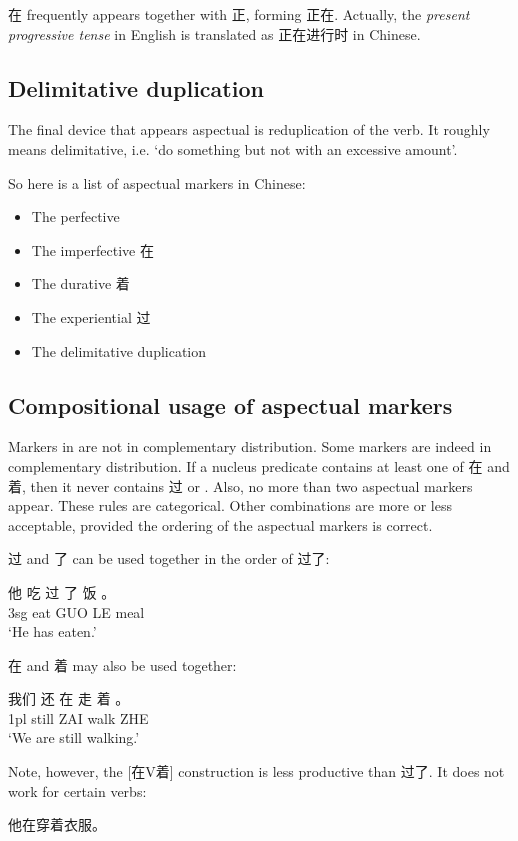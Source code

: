 在 frequently appears together with 正, forming 正在. 
Actually, the \emph{present progressive tense} in English is translated as 正在进行时 in Chinese.

\subsection{Delimitative duplication}\label{sec:delimitative-duplication}

The final device that appears aspectual is reduplication of the verb. 
It roughly means delimitative, i.e. `do something but not with an excessive amount'.

So here is a list of aspectual markers in Chinese: 
\begin{itemize}
    \item The perfective 
    \item The imperfective 在
    \item The durative 着
    \item The experiential 过
    \item The delimitative duplication
\end{itemize}

\subsection{Compositional usage of aspectual markers}

Markers in  are not in complementary distribution.
Some markers are indeed in complementary distribution. 
If a nucleus predicate contains at least one of 在 and 着, 
then it never contains 过 or .
Also, no more than two aspectual markers appear.
These rules are categorical. Other combinations are more or less acceptable,
provided the ordering of the aspectual markers is correct.

过 and 了 can be used together in the order of 过了: 
\begin{exe}
    \ex \gll 他 吃 过 了 饭 。\\
    3sg eat GUO LE meal \\
    \glt `He has eaten.'
\end{exe}
在 and 着 may also be used together:
\begin{exe}
    \ex \gll 我们 还 在 走 着 。 \\
    1pl still ZAI walk ZHE \\
    \glt `We are still walking.'
\end{exe}
Note, however, the [在V着] construction is less productive than 过了. It does not work for certain verbs:
\begin{exe}
    \ex *他在穿着衣服。
\end{exe} 

